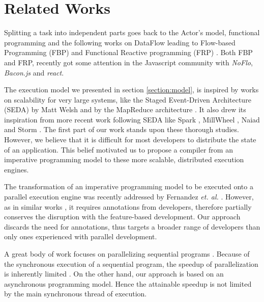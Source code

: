 \section{Related Works} \label{section:related}

Splitting a task into independent parts goes back to the Actor's model, functional programming \cite{Hughes1989} and the following works on Data\-Flow leading to Flow-based Programming (FBP) and Functional Reactive program\-ming (FRP) \cite{Elliott1997}.
Both FBP and FRP, recently got some attention in the Javascript community with \textit{NoFlo}, \textit{Bacon.js} and \textit{react}.

The execution model we presented in section \ref{section:model}, is inspired by works on scalability for very large systems, like the Staged Event-Driven Architecture (SEDA) by Matt Welsh \cite{Welsh2000} and by the MapReduce architecture \cite{Dean2008}.
It also drew its inspiration from more recent work following SEDA like Spark \cite{Zaharia2012}, MillWheel \cite{Akidau2013}, Naiad \cite{McSherry} and Storm \cite{Toshniwal2014}.
The first part of our work stands upon these thorough studies.
However, we believe that it is difficult for most developers to distribute the state of an application.
This belief motivated us to propose a compiler from an imperative programming model to these more scalable, distributed execution engines.

The transformation of an imperative programming model to be executed onto a parallel execution engine was recently addressed by Fernandez \textit{et. al.} \cite{Fernandez2014a}.
However, as in similar works \cite{Power2010}, it requires annotations from developers, therefore partially conserves the disruption with the feature-based development.
Our approach discards the need for annotations, thus targets a broader range of developers than only ones experienced with parallel development.

A great body of work focuses on parallelizing sequential programs \cite{Banerjee2013,Li2012,Matsakis2012a,Radoi2014}.
Because of the synchronous execution of a sequential program, the speedup of parallelization is inherently limited \cite{Amdahl1967,Gunther2008}.
On the other hand, our approach is based on an asynchronous programming model.
Hence the attainable speedup is not limited by the main synchronous thread of execution.